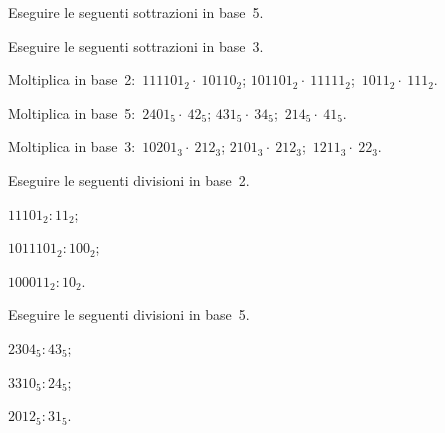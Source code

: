 \begin{esercizio}
 \label{ese:4.25}
 Eseguire le seguenti sottrazioni in base~5.

 
\end{esercizio}

\begin{esercizio}
 \label{ese:4.26}
 Eseguire le seguenti sottrazioni in base~3.

 
\end{esercizio}


\begin{esercizio}
 \label{ese:4.27}
Moltiplica in base~2:~\quad$111101_{2}\cdot~10110_{2}$;\quad
$101101_{2}\cdot~11111_{2}$;\quad~$1011_{2}\cdot~111_{2}$.
\end{esercizio}

\begin{esercizio}
 \label{ese:4.28}
Moltiplica in base~5:~\quad$2401_{5}\cdot~42_{5}$;\quad
$431_{5}\cdot~34_{5}$;\quad~$214_{5}\cdot~41_{5}$.
\end{esercizio}

\begin{esercizio}
 \label{ese:4.29}
Moltiplica in base~3:~\quad$10201_{3}\cdot~212_{3}$;\quad
$2101_{3}\cdot~212_{3}$;\quad~$1211_{3}\cdot~22_{3}$.
\end{esercizio}

\begin{esercizio}[*]
\label{ese:4.30}
Eseguire le seguenti divisioni in base~2.
 \begin{multicols}{3}
 \begin{enumeratea}
  \item $11101_2:11_2$;
  \item $1011101_2:100_2$;
  \item $100011_2:10_2$.
 \end{enumeratea}
 \end{multicols}
\end{esercizio}

\begin{esercizio}[*]
\label{ese:4.31}
Eseguire le seguenti divisioni in base~5.
 \begin{multicols}{3}
 \begin{enumeratea}
  \item $2304_5:43_5$;
  \item $3310_5:24_5$;
  \item $2012_5:31_5$.
 \end{enumeratea}
 \end{multicols}
\end{esercizio}

